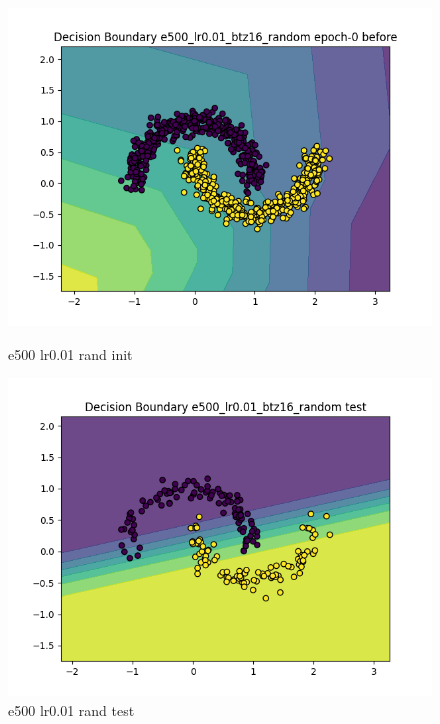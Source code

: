 \documentclass[8pt]{article}
\begin{document}
\begin{figure}[H]
    \begin{minipage}{0.32\textwidth}
        \centering
        \includegraphics[width=\textwidth]{../Prob4/out/1024_173617/e500_lr0.01_btz16_random/decision_boundary_epoch-0 before.png}
        \caption{e500 lr0.01 rand init}
        \label{fig:e500 lr0.01 rand init}
    \end{minipage}
    \begin{minipage}{0.32\textwidth}
        \centering
        \includegraphics[width=\textwidth]{../Prob4/out/1024_173617/e500_lr0.01_btz16_random/decision_boundary_test.png}
        \caption{e500 lr0.01 rand test}
        \label{fig:e500 lr0.01 rand test}
    \end{minipage}

\end{figure}
\end{document}
